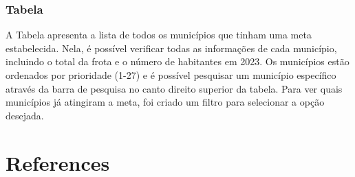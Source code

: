 \documentclass[
  letterpaper,
  DIV=11,
  numbers=noendperiod]{scrreprt}
\newlength{\cslhangindent}
\newenvironment{CSLReferences}[2] %
 {\begin{list}{}{%
  \setlength{\itemindent}{0pt}
  \setlength{\leftmargin}{0pt}
  \setlength{\parsep}{0pt}
  \ifodd #1
   \setlength{\leftmargin}{\cslhangindent}
   \setlength{\itemindent}{-1\cslhangindent}
  \fi
  \setlength{\itemsep}{#2\baselineskip}}}
 {\end{list}}
\begin{document}
\subsection{Tabela}\label{tabela}

A Tabela apresenta a lista de todos os municípios que tinham uma meta
estabelecida. Nela, é possível verificar todas as informações de cada
município, incluindo o total da frota e o número de habitantes em 2023.
Os municípios estão ordenados por prioridade (1-27) e é possível
pesquisar um município específico através da barra de pesquisa no canto
direito superior da tabela. Para ver quais municípios já atingiram a
meta, foi criado um filtro para selecionar a opção desejada.


\chapter*{References}\label{references}


\label{refs}
\begin{CSLReferences}{0}{1}
\end{CSLReferences}
\end{document}
